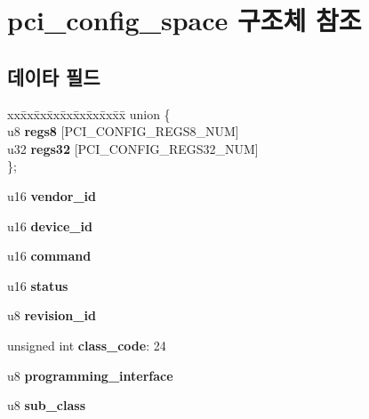 \section{pci\-\_\-config\-\_\-space 구조체 참조}
\label{structpci__config__space}
\subsection*{데이타 필드}
\begin{DoxyCompactItemize}
\item 
\begin{tabbing}
xx\=xx\=xx\=xx\=xx\=xx\=xx\=xx\=xx\=\kill
union \{\\
\>u8 {\bfseries regs8} [PCI\_CONFIG\_REGS8\_NUM]\\
\>u32 {\bfseries regs32} [PCI\_CONFIG\_REGS32\_NUM]\\
\}; \label{structpci__config__space_adf5f11d5e13e259e076e08f987d4920b}
\\

\end{tabbing}\item 
u16 {\bfseries vendor\-\_\-id}\label{structpci__config__space_ae45b9e3e2201cb3c90e0f5cebeb49a07}

\item 
u16 {\bfseries device\-\_\-id}\label{structpci__config__space_a4583fb19e9e19ff4d77affa0dec0e950}

\item 
u16 {\bfseries command}\label{structpci__config__space_ae3c9a7738914370ff471e2290328a93d}

\item 
u16 {\bfseries status}\label{structpci__config__space_a0563f3e9c68363bff3e3680f4034167f}

\item 
u8 {\bfseries revision\-\_\-id}\label{structpci__config__space_a4dd075008b6636210f863609aa990d3c}

\item 
unsigned int {\bfseries class\-\_\-code}\-: 24\label{structpci__config__space_ae1364976b3e31c5733e74da82f07b277}

\item 
u8 {\bfseries programming\-\_\-interface}\label{structpci__config__space_aa6f2525a0abbc42cba92d0556f56c230}

\item 
u8 {\bfseries sub\-\_\-class}\label{structpci__config__space_a06b08502c8d784cc4b59d6469f7df32c}


\end{DoxyCompactItemize}
